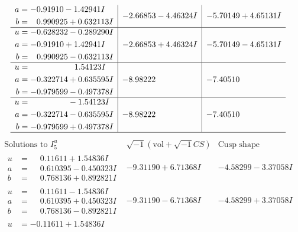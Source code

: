 \documentclass[1p]{elsarticle_modified}
\theoremstyle{definition}
\newcommand{\I}{\sqrt{-1}}
\begin{document}
$$\begin{array}{c|c|c}
\begin{aligned}
a &= -0.91910 - 1.42941 I \\
b &= \phantom{-}0.990925 + 0.632113 I\end{aligned}
 & -2.66853 - 4.46324 I & -5.70149 + 4.65131 I \\ \hline\begin{aligned}
u &= -0.628232 - 0.289290 I \\
a &= -0.91910 + 1.42941 I \\
b &= \phantom{-}0.990925 - 0.632113 I\end{aligned}
 & -2.66853 + 4.46324 I & -5.70149 - 4.65131 I \\ \hline\begin{aligned}
u &= \phantom{-0.000000 -}1.54123 I \\
a &= -0.322714 + 0.635595 I \\
b &= -0.979599 - 0.497378 I\end{aligned}
 & -8.98222\phantom{ +0.000000I} & -7.40510\phantom{ +0.000000I} \\ \hline\begin{aligned}
u &= \phantom{-0.000000 } -1.54123 I \\
a &= -0.322714 - 0.635595 I \\
b &= -0.979599 + 0.497378 I\end{aligned}
 & -8.98222\phantom{ +0.000000I} & -7.40510\phantom{ +0.000000I}\\
 \hline 
 \end{array}$$\newpage$$\begin{array}{c|c|c}  
\text{Solutions to }I^u_{5}& \I (\text{vol} + \sqrt{-1}CS) & \text{Cusp shape}\\
 \hline 
\begin{aligned}
u &= \phantom{-}0.11611 + 1.54836 I \\
a &= \phantom{-}0.610395 - 0.450323 I \\
b &= \phantom{-}0.768136 + 0.892821 I\end{aligned}
 & -9.31190 + 6.71368 I & -4.58299 - 3.37058 I \\ \hline\begin{aligned}
u &= \phantom{-}0.11611 - 1.54836 I \\
a &= \phantom{-}0.610395 + 0.450323 I \\
b &= \phantom{-}0.768136 - 0.892821 I\end{aligned}
 & -9.31190 - 6.71368 I & -4.58299 + 3.37058 I \\ \hline\begin{aligned}
u &= -0.11611 + 1.54836 I \\

\end{aligned}
\end{array}$$
\end{document}
